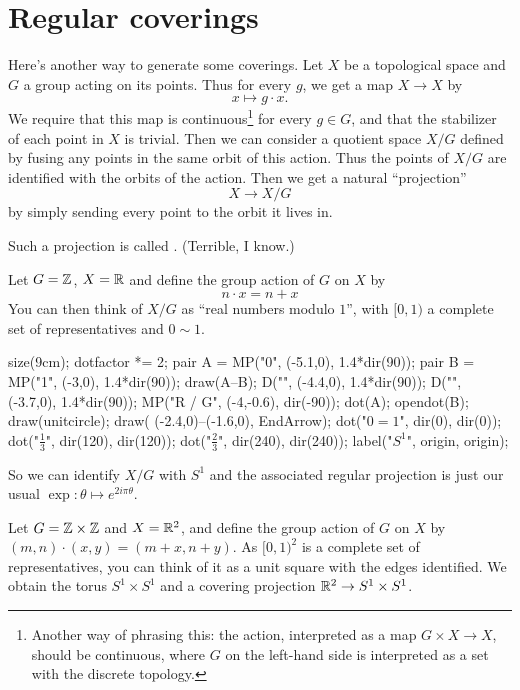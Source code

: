 \section{Regular coverings}

Here's another way to generate some coverings.
Let $X$ be a topological space and $G$ a group acting on its points.
Thus for every $g$, we get a map $X \to X$ by 
\[ x \mapsto g \cdot x. \]
We require that this map is continuous\footnote{%
	Another way of phrasing this: the action,
	interpreted as a map $G \times X \to X$, should be continuous,
	where $G$ on the left-hand side is interpreted as a set with
	the discrete topology.}
for every $g \in G$, and that the stabilizer of each point in $X$ is trivial.
Then we can consider a quotient space $X/G$ defined by fusing any points
in the same orbit of this action.
Thus the points of $X/G$ are identified with the orbits of the action.
Then we get a natural ``projection''
\[ X \to X/G \]
by simply sending every point to the orbit it lives in.
\begin{definition}
	Such a projection is called .
	(Terrible, I know.)
\end{definition}

\begin{example}[$\RR \to S^1$ is regular]
	Let $G = \mathbb Z$, $X = \mathbb R$
	and define the group action of $G$ on $X$ by 
	\[ n \cdot x = n + x \]
	You can then think of $X/G$ as ``real numbers modulo $1$'',
	with $[0,1)$ a complete set of representatives and $0 \sim 1$. %
	\begin{center}
		\begin{asy}
			size(9cm);
			dotfactor *= 2;
			pair A = MP("0", (-5.1,0), 1.4*dir(90));
			pair B = MP("1", (-3,0), 1.4*dir(90));
			draw(A--B);
			D("", (-4.4,0), 1.4*dir(90));
			D("", (-3.7,0), 1.4*dir(90));
			MP("\mathbb R / G", (-4,-0.6), dir(-90));
			dot(A); opendot(B);
			draw(unitcircle);
			draw( (-2.4,0)--(-1.6,0), EndArrow);
			dot("$0=1$", dir(0), dir(0));
			dot("$\frac13$", dir(120), dir(120));
			dot("$\frac23$", dir(240), dir(240));
			label("$S^1$", origin, origin);
		\end{asy}
	\end{center}
	So we can identify $X/G$ with $S^1$
	and the associated regular projection
	is just our usual $\exp : \theta \mapsto e^{2i\pi \theta}$.
\end{example}
	
\begin{example}
	Let $G = \mathbb Z \times \mathbb Z$ and $X = \mathbb R^2$,
	and define the group action of $G$ on $X$ by $(m,n) \cdot (x,y)
	= (m+x, n+y)$.
	As $[0,1)^2$ is a complete set of representatives, %
	you can think of it as a unit square with the edges identified.
	We obtain the torus $S^1 \times S^1$
	and a covering projection $\mathbb R^2 \to S^1 \times S^1$.
\end{example}

